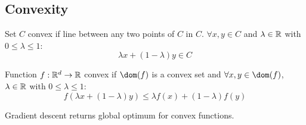 \subsection{Convexity}

Set $C$ convex if line between any two points of $C$ in $C$. $\forall x,y \in C$ and $\lambda \in \mathbb{R}$ with $0 \leq \lambda \leq 1$: \[\lambda x + (1 - \lambda) y \in C\]

Function $f: \mathbb{R}^d \to \mathbb{R}$ convex if $\dom(f)$ is a convex set and $\forall x,y \in \dom(f)$, $\lambda \in \mathbb{R}$ with $0 \leq \lambda \leq 1$: \[f(\lambda x + (1 - \lambda) y) \leq \lambda f(x) + (1 - \lambda) f(y)\]

Gradient descent returns global optimum for convex functions.
